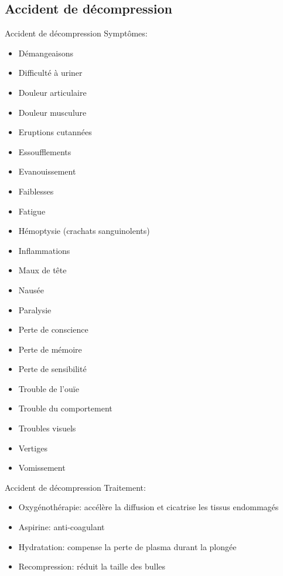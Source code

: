 \subsection{Accident de décompression}

\begin{frame}{Accident de décompression}  
	Symptômes:
	\begin{multicols}{2}
		\begin{itemize}
			\item Démangeaisons
			\item Difficulté à uriner
			\item Douleur articulaire
			\item Douleur musculure
			\item Eruptions cutannées
			\item Essoufflements
			\item Evanouissement
			\item Faiblesses
			\item Fatigue
			\item Hémoptysie (crachats sanguinolents)
			\item Inflammations
			\item Maux de tête
			\item Nausée
			\item Paralysie
			\item Perte de conscience
			\item Perte de mémoire
			\item Perte de sensibilité
			\item Trouble de l'ouïe
			\item Trouble du comportement
			\item Troubles visuels
			\item Vertiges
			\item Vomissement
		\end{itemize}
	\end{multicols}
\end{frame}

\begin{frame}{Accident de décompression}
	Traitement:
	\begin{itemize}
		\item Oxygénothérapie: accélère la diffusion et cicatrise les tissus endommagés
		\item Aspirine: anti-coagulant
		\item Hydratation: compense la perte de plasma durant la plongée
		\item Recompression: réduit la taille des bulles
	\end{itemize}
\end{frame}

